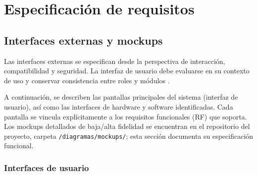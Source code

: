 \documentclass[11pt,a4paper]{article}
\begin{document}
	
	
	\section{ Especificación de requisitos}
	
	\subsection{ Interfaces externas y mockups}
	
	Las interfaces externas se especifican desde la perspectiva de interacción,
	compatibilidad y seguridad. La interfaz de usuario debe evaluarse en su contexto
	de uso y conservar consistencia entre roles y módulos \cite{iso9241,carayon2014}.
	
	A continuación, se describen las pantallas principales del sistema (interfaz de usuario), así como las interfaces de hardware y software identificadas. Cada pantalla se vincula explícitamente a los requisitos funcionales (RF) que soporta. Los mockups detallados de baja/alta fidelidad se encuentran en el repositorio del proyecto, carpeta \texttt{/diagramas/mockups/}; esta sección documenta su especificación funcional.
	
	\subsubsection{ Interfaces de usuario}
	
	
	
\end{document}
